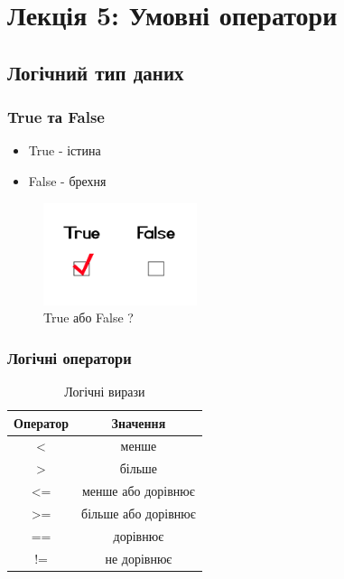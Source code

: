 \section*{Лекція 5: Умовні оператори}
 
 \subsection{Логічний тип даних} 
\begin{frame}
\frametitle{True та False}
\begin{itemize}
  \item True - істина
  \item False - брехня
 \end{itemize}

\begin{figure}
\begin{center}
 \includegraphics[width=0.4\textwidth]{pictures/TrueFalse.png}
\caption{True або False ?}
\label{TrueFalse} 
\end{center}
\end{figure}
\end{frame}

\begin{frame}
\frametitle{Логічні оператори}

\begin{table}
  \caption{Логічні вирази}
  \label{tab:}

  \begin{center}
    \begin{tabular}{|c|c|}
    \hline
      \textbf{Оператор} & \textbf{Значення} \\
    \hline  
      < & менше \\
    \hline
      >  & більше\\
    \hline
      <=  & менше або дорівнює \\
    \hline
      >=  & більше або дорівнює\\
    \hline
      ==  & дорівнює \\
    \hline
      !=  & не дорівнює \\
    \hline
    \end{tabular}
  \end{center}
\end{table}

\end{frame}

